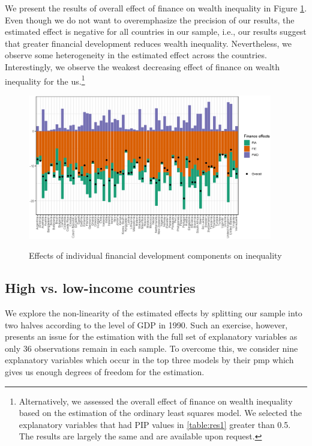 \documentclass[a4paper,11pt]{article}
\begin{document}
We present the results of overall effect of finance on wealth inequality in Figure \ref{fig:finance_effect}. Even though we do not want to overemphasize the precision of our results, the estimated effect is negative for all countries in our sample, i.e., our results suggest that greater financial development reduces wealth inequality. Nevertheless, we observe some heterogeneity in the estimated effect across the countries. Interestingly, we observe the weakest decreasing effect of finance on wealth inequality for the \ac{us}.\footnote{Alternatively, we assessed the overall effect of finance on wealth inequality based on the estimation of the ordinary least squares model. We selected the explanatory variables that had PIP values in \ref{table:res1} greater than 0.5. The results are largely the same and are available upon request.}

\begin{figure}
\begin{center}
\caption{Effects of individual financial development components on inequality}
\includegraphics[width=0.95\textwidth]{figures/finance_effect.eps}
\label{fig:finance_effect}
\end{center}
\end{figure}

\subsection{High vs. low-income countries}
We explore the non-linearity of the estimated effects by splitting our sample into two halves according to the level of GDP in 1990. Such an exercise, however, presents an issue for the estimation with the full set of explanatory variables as only 36 observations remain in each sample. To overcome this, we consider nine explanatory variables which occur in the top three models by their \ac{pmp} which gives us enough degrees of freedom for the estimation. 
\end{document}
